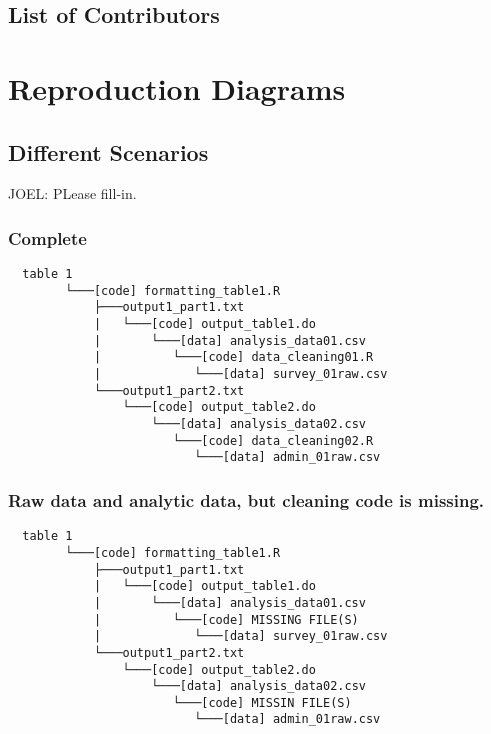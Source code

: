 \documentclass[]{book}
\begin{document}
\hypertarget{list-of-contributors}{%
\section{List of Contributors}\label{list-of-contributors}}

\hypertarget{reproduction-diagrams}{%
\chapter{Reproduction Diagrams}\label{reproduction-diagrams}}

\hypertarget{different-scenarios}{%
\section{Different Scenarios}\label{different-scenarios}}

JOEL: PLease fill-in.

\hypertarget{complete}{%
\subsection{Complete}\label{complete}}

\begin{verbatim}
  table 1
        └───[code] formatting_table1.R
            ├───output1_part1.txt  
            |   └───[code] output_table1.do           
            |       └───[data] analysis_data01.csv
            |          └───[code] data_cleaning01.R
            |             └───[data] survey_01raw.csv
            └───output1_part2.txt  
                └───[code] output_table2.do           
                    └───[data] analysis_data02.csv
                       └───[code] data_cleaning02.R
                          └───[data] admin_01raw.csv  
\end{verbatim}

\hypertarget{raw-data-and-analytic-data-but-cleaning-code-is-missing.}{%
\subsection{Raw data and analytic data, but cleaning code is missing.}\label{raw-data-and-analytic-data-but-cleaning-code-is-missing.}}

\begin{verbatim}
  table 1
        └───[code] formatting_table1.R
            ├───output1_part1.txt  
            |   └───[code] output_table1.do           
            |       └───[data] analysis_data01.csv
            |          └───[code] MISSING FILE(S)
            |             └───[data] survey_01raw.csv
            └───output1_part2.txt  
                └───[code] output_table2.do           
                    └───[data] analysis_data02.csv
                       └───[code] MISSIN FILE(S)
                          └───[data] admin_01raw.csv  
\end{verbatim}
\end{document}
